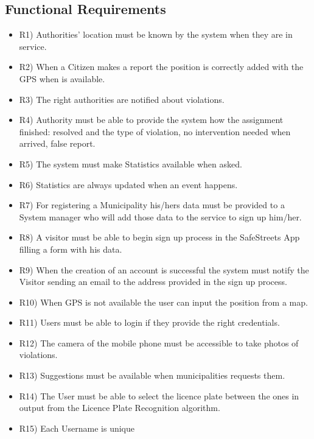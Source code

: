 \subsection{Functional Requirements}
\begin{itemize}

 \item R1) Authorities’ location must be known by the system when they are in service.
\item  R2) When a Citizen makes a report the position is correctly added with the GPS when is available.
\item R3) The right authorities are notified about violations.
 \item R4)  Authority must be able to provide the system how the assignment finished: resolved and the type of violation, no intervention needed when arrived, false report.
 \item R5) The system must make Statistics available when asked.
 \item R6) Statistics are always updated when an event happens.  
\item R7) For registering a Municipality his/hers data must be provided to a System manager who will add those data to the service to sign up him/her.
 \item R8) A visitor must be able to begin sign up process in the SafeStreets App filling a form with his data.
 \item R9) When the creation of an account is successful the system must notify the Visitor sending an email to the address provided in the sign up process. 
 \item R10) When GPS is not available the user can input the position from a map.
 \item R11) Users must be able to login if they provide the right credentials.
\item R12) The camera of the mobile phone must be accessible to take photos of violations.
\item R13) Suggestions must be available when municipalities requests them.
\item R14) The User must be able to select the licence plate between the ones in output from the Licence Plate Recognition algorithm.
\item R15) Each Username is unique
\end{itemize}
